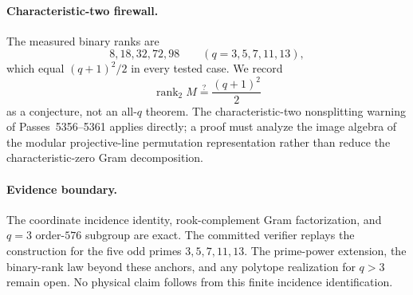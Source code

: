 \paragraph{Characteristic-two firewall.}
The measured binary ranks are
\[
 8,18,32,72,98
 \qquad(q=3,5,7,11,13),
\]
which equal $(q+1)^2/2$ in every tested case.  We record
\[
 \operatorname{rank}_2M\stackrel{?}=\frac{(q+1)^2}{2}
\]
as a conjecture, not an all-$q$ theorem.  The characteristic-two nonsplitting
warning of Passes~5356--5361 applies directly; a proof must analyze the image
algebra of the modular projective-line permutation representation rather than
reduce the characteristic-zero Gram decomposition.

\paragraph{Evidence boundary.}
The coordinate incidence identity, rook-complement Gram factorization, and
$q=3$ order-$576$ subgroup are exact.  The committed verifier replays the
construction for the five odd primes $3,5,7,11,13$.  The prime-power extension,
the binary-rank law beyond these anchors, and any polytope realization for
$q>3$ remain open.  No physical claim follows from this finite incidence
identification.
